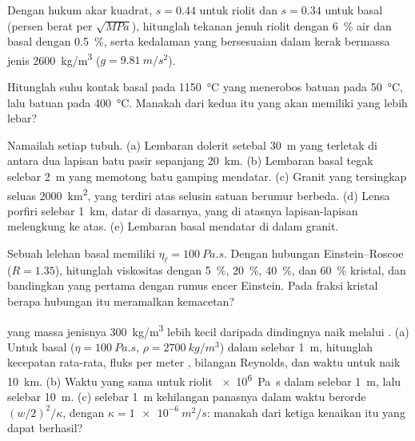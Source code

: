 \begin{exercise}[$\star$]\label{exo:b2:magma-emplacement:2}
Dengan hukum akar kuadrat, $s = 0.44$ untuk riolit dan $s = 0.34$ untuk basal
(persen berat per $\sqrt{\unit{MPa}}$), hitunglah tekanan jenuh
riolit dengan \qty{6}{\percent} air dan basal dengan \qty{0.5}{\percent},
serta kedalaman yang bersesuaian dalam kerak bermassa jenis \qty{2600}{kg/m^3}
($g = \qty{9.81}{m/s^2}$).
\end{exercise}

\begin{exercise}[$\star$]\label{exo:b2:magma-emplacement:3}
Hitunglah suhu kontak  basal pada \qty{1150}{\celsius}
yang menerobos batuan pada \qty{50}{\celsius}, lalu batuan pada
\qty{400}{\celsius}. Manakah dari kedua  itu yang akan memiliki  yang lebih lebar?
\end{exercise}

\begin{exercise}[$\star$]\label{exo:b2:magma-emplacement:4}
Namailah setiap tubuh. (a) Lembaran dolerit setebal \qty{30}{m} yang terletak di antara dua lapisan
batu pasir sepanjang \qty{20}{km}. (b) Lembaran basal tegak selebar \qty{2}{m}
yang memotong batu gamping mendatar. (c) Granit yang tersingkap seluas \qty{2000}{km^2},
yang terdiri atas selusin satuan berumur berbeda. (d) Lensa porfiri selebar \qty{1}{km},
datar di dasarnya, yang di atasnya lapisan-lapisan melengkung ke atas. (e) Lembaran basal mendatar
di dalam granit.
\end{exercise}

\begin{exercise}[$\star\star$]\label{exo:b2:magma-emplacement:5}
Sebuah lelehan basal memiliki $\eta_{\ell} = \qty{100}{Pa.s}$. Dengan hubungan Einstein--Roscoe
($R = 1.35$), hitunglah viskositas  dengan
\qty{5}{\percent}, \qty{20}{\percent}, \qty{40}{\percent}, dan \qty{60}{\percent}
kristal, dan bandingkan yang pertama dengan rumus encer Einstein. Pada fraksi kristal
berapa hubungan itu meramalkan kemacetan?
\end{exercise}

\begin{exercise}[$\star\star$]\label{exo:b2:magma-emplacement:6}
 yang massa jenisnya \qty{300}{kg/m^3} lebih kecil daripada dindingnya naik melalui .
(a) Untuk basal ($\eta = \qty{100}{Pa.s}$, $\rho = \qty{2700}{kg/m^3}$) dalam 
selebar \qty{1}{m}, hitunglah kecepatan rata-rata, fluks per meter ,
bilangan Reynolds, dan waktu untuk naik \qty{10}{km}. (b) Waktu yang sama untuk riolit
\qty{e6}{Pa.s} dalam  selebar \qty{1}{m}, lalu selebar \qty{10}{m}. (c) 
selebar \qty{1}{m} kehilangan panasnya dalam waktu berorde $(w/2)^2/\kappa$, dengan $\kappa =
\qty{1e-6}{m^2/s}$: manakah dari ketiga kenaikan itu yang dapat berhasil?
\end{exercise}

